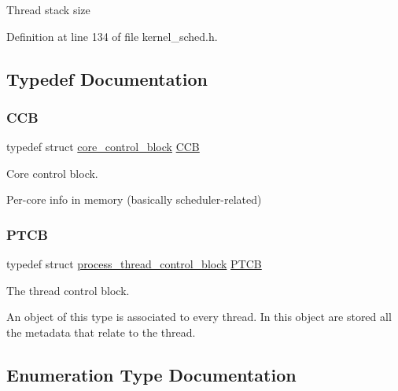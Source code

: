 Thread stack size 

Definition at line 134 of file kernel\+\_\+sched.\+h.



\subsection{Typedef Documentation}
\mbox{\label{group__scheduler_ga7485b31e0dd9fd723bc2d75fba5206a0}} 
\subsubsection{\texorpdfstring{C\+CB}{CCB}}
{\footnotesize\ttfamily typedef struct \hyperlink{structcore__control__block}{core\+\_\+control\+\_\+block}  \hyperlink{group__scheduler_ga7485b31e0dd9fd723bc2d75fba5206a0}{C\+CB}}



Core control block. 

Per-\/core info in memory (basically scheduler-\/related) \mbox{\label{group__scheduler_ga2115e4c199a702aaf36f4571877bf013}} 
\subsubsection{\texorpdfstring{P\+T\+CB}{PTCB}}
{\footnotesize\ttfamily typedef struct \hyperlink{structprocess__thread__control__block}{process\+\_\+thread\+\_\+control\+\_\+block} \hyperlink{group__scheduler_ga2115e4c199a702aaf36f4571877bf013}{P\+T\+CB}}



The thread control block. 

An object of this type is associated to every thread. In this object are stored all the metadata that relate to the thread. 

\subsection{Enumeration Type Documentation}
\mbox{\label{group__scheduler_gaad787d8d80312ffca3c0f197b3a25fbe}} 
